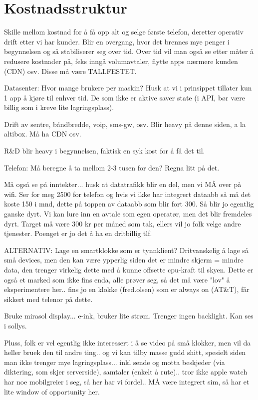 \section{Kostnadsstruktur}

Skille mellom kostnad for å få opp alt og selge første telefon, deretter
operativ drift etter vi har kunder. Blir en overgang, hvor det brennes mye
penger i begynnelsen og så stabiliserer seg over tid. Over tid vil man også se
etter måter å redusere kostnader på, feks inngå volumavtaler, flytte apps
nærmere kunden (CDN) osv. Disse må være TALLFESTET.

Datasenter: Hvor mange brukere per maskin? Husk at vi i prinsippet tillater kun
1 app å kjøre til enhver tid. De som ikke er aktive saver state (i API, bør
være billig som i kreve lite lagringsplass).

Drift av sentre, båndbredde, voip, sms-gw, osv. Blir heavy på denne siden, a la
altibox. Må ha CDN osv.

R\&{}D blir heavy i begynnelsen, faktisk en syk kost for å få det til.

Telefon: Må beregne å ta mellom 2-3 tusen for den? Regna litt på det.

Må også se på inntekter... husk at datatrafikk blir en del, men vi MÅ over på
wifi. Ser for meg 2500 for telefon og hvis vi ikke har integrert dataabb så må
det koste 150 i mnd, dette på toppen av dataabb som blir fort 300. Så blir jo
egentlig ganske dyrt. Vi kan lure inn en avtale som egen operatør, men det blir
fremdeles dyrt. Target må være 300 kr per måned som tak, ellers vil jo folk
velge andre tjenester. Poenget er jo det å ha en dritbillig tlf.

ALTERNATIV: Lage en smartklokke som er tynnklient? Dritvanskelig å lage så små
devices, men den kan være ypperlig siden det er mindre skjerm = mindre data,
den trenger virkelig dette med å kunne offsette cpu-kraft til skyen. Dette er
også et marked som ikke fins enda, alle prøver seg, så det må være "lov" å
eksperimentere her.. fins jo en klokke (fred.olsen) som er always on (AT\&{}T),
får sikkert med telenor på dette.

Bruke mirasol display... e-ink, bruker lite strøm. Trenger ingen backlight. Kan
ses i sollys.

Pluss, folk er vel egentlig ikke interessert i å se video på små klokker, men
vil da heller bruek den til andre ting.. og vi kan tilby masse gudd shitt,
spesielt siden man ikke trenger mye lagringsplass... inkl sende og motta
beskjeder (via diktering, som skjer serverside), samtaler (enkelt å rute)..
tror ikke apple watch har noe mobilgreier i seg, så her har vi fordel.. MÅ være
integrert sim, så har et lite window of opportunity her.

